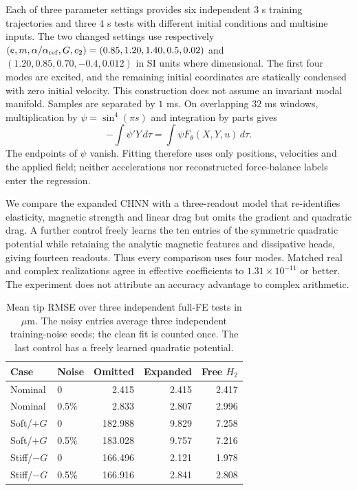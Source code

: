 Each of three parameter settings provides six independent $3$ s training
trajectories and three $4$ s tests with different initial conditions and
multisine inputs. The two changed settings use respectively
$(e,m,\alpha/\alpha_{\rm ref},G,c_2)
=(0.85,1.20,1.40,0.5,0.02)$ and
$(1.20,0.85,0.70,-0.4,0.012)$ in SI units where dimensional.
The first four modes are excited, and the remaining initial coordinates
are statically condensed with zero initial velocity. This construction
does not assume an invariant modal manifold. Samples are separated by
$1$ ms. On overlapping $32$ ms windows, multiplication by
$\psi=\sin^4(\pi s)$ and integration by parts gives
\begin{equation}
 -\int\psi'Y\,d\tau=\int\psi F_\theta(X,Y,u)\,d\tau.
 \label{eq:robust-weakfit}
\end{equation}
The endpoints of $\psi$ vanish. Fitting therefore uses only positions,
velocities and the applied field; neither accelerations nor reconstructed
force-balance labels enter the regression.

We compare the expanded CHNN with a three-readout model that re-identifies
elasticity, magnetic strength and linear drag but omits the gradient and
quadratic drag. A further control freely learns the ten entries of the
symmetric quadratic potential while retaining the analytic magnetic
features and dissipative heads, giving fourteen readouts. Thus every
comparison uses four modes. Matched real and complex realizations agree
in effective coefficients to $1.31\times10^{-11}$ or better. The experiment
does not attribute an accuracy advantage to complex arithmetic.

\begin{table}[t]
\caption{Mean tip RMSE over three independent full-FE tests in $\mu$m.
The noisy entries average three independent training-noise seeds; the
clean fit is counted once. The last control has a freely learned
quadratic potential.}
\label{tab:robustness-state-noise}
\centering\small
\begin{tabular}{llrrr}
\toprule
Case & Noise & Omitted & Expanded & Free $H_2$\\
\midrule
Nominal & 0 & 2.415 & 2.415 & 2.417\\
Nominal & 0.5\% & 2.833 & 2.807 & 2.996\\
Soft/$+G$ & 0 & 182.988 & 9.829 & 7.258\\
Soft/$+G$ & 0.5\% & 183.028 & 9.757 & 7.216\\
Stiff/$-G$ & 0 & 166.496 & 2.121 & 1.978\\
Stiff/$-G$ & 0.5\% & 166.916 & 2.841 & 2.808\\
\bottomrule
\end{tabular}
\end{table}

